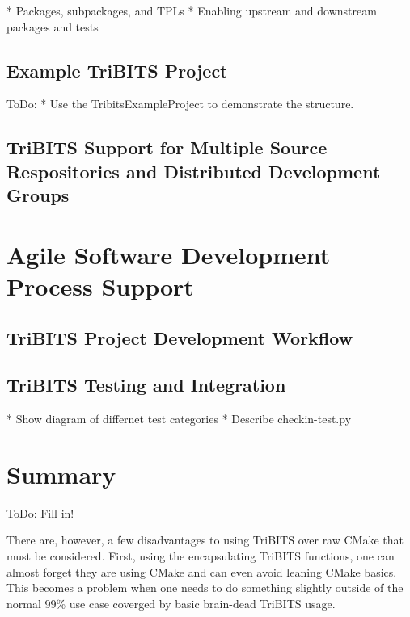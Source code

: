 \documentclass[note]{TechNote}
\begin{document}
* Packages, subpackages, and TPLs
* Enabling upstream and downstream packages and tests

%
\subsection{Example TriBITS Project}
%

ToDo:
* Use the TribitsExampleProject to demonstrate the structure.


%
\subsection{TriBITS Support for Multiple Source Respositories and Distributed Development Groups}
%


%
\section{Agile Software Development Process Support}
%


%
\subsection{TriBITS Project Development Workflow}
%


%
\subsection{TriBITS Testing and Integration}
%

* Show diagram of differnet test categories
* Describe checkin-test.py


%
\section{Summary}
%

ToDo: Fill in!

There are, however, a few disadvantages to using TriBITS over raw CMake that must be considered.  First, using the encapsulating TriBITS functions, one can almost forget they are using CMake and can even avoid leaning CMake basics.  This becomes a problem when one needs to do something slightly outside of the normal 99\% use case coverged by basic brain-dead TriBITS usage.





\closing
\caution
\end{document}
